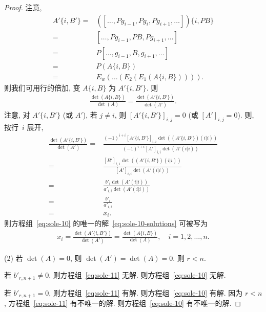 \documentclass[../libro.tex]{subfiles}
\begin{document}
\begin{proof}
    注意,
    \begin{align*}
        A' \{i, B'\}
        = {} &
        ([\dots, P g_{i-1}, P g_i, P g_{i+1}, \dots])
        \{i, P B\}
        \\
        = {} &
        [\dots, P g_{i-1}, P B, P g_{i+1}, \dots]
        \\
        = {} &
        P [\dots, g_{i-1}, B, g_{i+1}, \dots]
        \\
        = {} &
        P (A\{i, B\})
        \\
        = {} &
        E_w (\dots (E_2 (E_1 (A\{i, B\})))).
    \end{align*}
    则我们可用行的倍加,
    变 \(A\{i, B\}\) 为 \(A' \{i, B'\}\).
    则
    \begin{align*}
        \frac{\det {(A\{i, B\})}}{\det {(A)}}
        = \frac{\det {(A' \{i, B'\})}}{\det {(A')}}.
    \end{align*}
    注意, 对 \(A' \{i, B'\}\) (或 \(A'\)),
    若 \(j \neq i\),
    则 \([A' \{i, B'\}]_{i,j} = 0\)
    (或 \([A']_{i,j} = 0\)).
    则, 按行~\(i\) 展开,
    \begin{align*}
        \frac{\det {(A' \{i, B'\})}}{\det {(A')}}
        = {} &
        \frac%
        {(-1)^{i+i} [A' \{i, B'\}]_{i,i}
        \det {((A' \{i, B'\}) (i|i))}}%
        {(-1)^{i+i} [A']_{i,i}
        \det {(A' (i|i))}}
        \\
        = {} &
        \frac{[B']_{i,1} \det {((A' \{i, B'\}) (i|i))}}
        {[A']_{i,i} \det {(A' (i|i))}}
        \\
        = {} &
        \frac{b'_i \det {(A' (i|i))}}
        {a'_{i,i} \det {(A' (i|i))}}
        \\
        = {} &
        \frac{b'_i}{a'_{i,i}}
        \\
        = {} &
        x_i.
    \end{align*}
    则方程组~\eqref{eq:sole-10}
    的唯一的解~\eqref{eq:sole-10-solutions} 可被写为
    \begin{align*}
        x_i
        = \frac{\det {(A' \{i, B'\})}}{\det {(A')}}
        = \frac{\det {(A\{i, B\})}}{\det {(A)}},
        \quad
        i = 1, 2, \dots, n.
    \end{align*}

    (2)
    若 \(\det {(A)} = 0\),
    则 \(\det {(A')} = \det {(A)} = 0\).
    则 \(r < n\).

    若 \(b'_{r,n+1} \neq 0\),
    则方程组~\eqref{eq:sole-11} 无解.
    则方程组~\eqref{eq:sole-10} 无解.

    若 \(b'_{r,n+1} = 0\),
    则方程组~\eqref{eq:sole-11} 有解.
    则方程组~\eqref{eq:sole-10} 有解.
    因为 \(r < n\),
    方程组~\eqref{eq:sole-11} 有不唯一的解.
    则方程组~\eqref{eq:sole-10} 有不唯一的解.
\end{proof}
\end{document}
